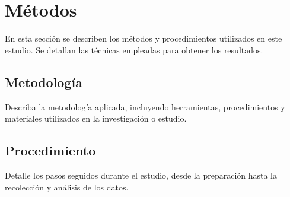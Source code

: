 \section{Métodos}

En esta sección se describen los métodos y procedimientos utilizados en este estudio. Se detallan las técnicas empleadas para obtener los resultados.

\subsection{Metodología}

Describa la metodología aplicada, incluyendo herramientas, procedimientos y materiales utilizados en la investigación o estudio.

\subsection{Procedimiento}

Detalle los pasos seguidos durante el estudio, desde la preparación hasta la recolección y análisis de los datos.
